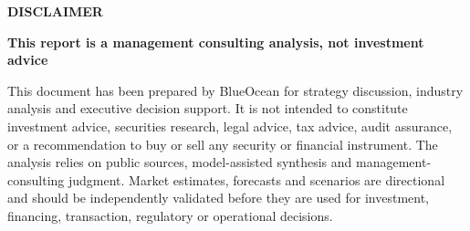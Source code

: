 \documentclass[10pt,a4paper]{article}
\begin{document}
\clearpage
{\textcolor{BOBlue}{\scriptsize\bfseries DISCLAIMER}}\par\vspace{-1pt}
{\Large\sffamily\bfseries\color{BONavy} This report is a management consulting analysis, not investment advice}\par\vspace{4pt}
\vspace{2pt}{\color{BOBright}\rule{\linewidth}{1pt}}\vspace{5pt}
{\small This document has been prepared by BlueOcean for strategy discussion, industry analysis and executive decision support. It is not intended to constitute investment advice, securities research, legal advice, tax advice, audit assurance, or a recommendation to buy or sell any security or financial instrument. The analysis relies on public sources, model-assisted synthesis and management-consulting judgment. Market estimates, forecasts and scenarios are directional and should be independently validated before they are used for investment, financing, transaction, regulatory or operational decisions.}\par
{}\par{}
\end{document}
